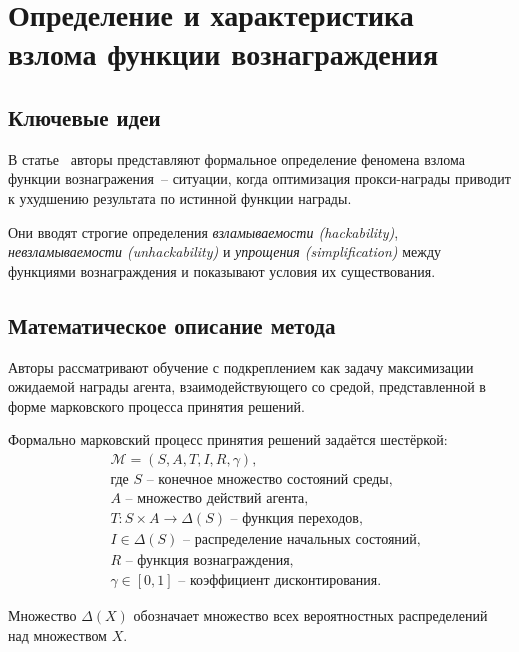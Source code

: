 \section{Определение и характеристика взлома функции вознаграждения}

\subsection{Ключевые идеи}

В статье~\cite{skalse2025defcharact} авторы представляют формальное определение феномена взлома функции вознагражения~-- ситуации, когда оптимизация прокси-награды приводит к ухудшению результата по истинной функции награды.

Они вводят строгие определения \emph{взламываемости (hackability)}, \emph{невзламываемости (unhackability)} и \emph{упрощения (simplification)} между функциями вознаграждения и показывают условия их существования.


\subsection{Математическое описание метода}

Авторы рассматривают обучение с подкреплением как задачу максимизации ожидаемой награды агента, взаимодействующего со средой, представленной в форме марковского процесса принятия решений.

Формально марковский процесс принятия решений задаётся шестёркой:
\begin{equation}
\begin{aligned}
    &\mathcal{M} = (S, A, T, I, R, \gamma), \\
    &\text{где } S\text{~-- конечное множество состояний среды,} \\
    &A\text{~-- множество действий агента,} \\
    &T : S \times A \to \Delta(S)\text{~-- функция переходов,} \\
    &I \in \Delta(S)\text{~-- распределение начальных состояний,} \\
    &R\text{~-- функция вознаграждения,} \\
    &\gamma \in [0,1]\text{~-- коэффициент дисконтирования.}
\end{aligned}
\end{equation}

Множество $\Delta(X)$ обозначает множество всех вероятностных распределений над множеством $X$.


